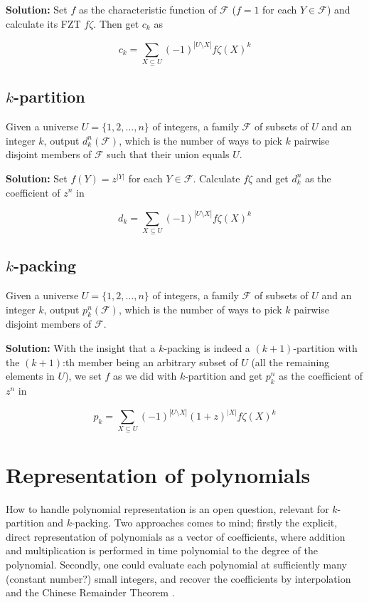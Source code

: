 \documentclass[a4paper, titlepage]{article}
\begin{document}
\textbf{Solution:} Set $f$ as the characteristic function of $\mathcal{F}$ ($f = 1$ for each $Y \in \mathcal{F}$) and calculate its FZT $f\zeta$. Then get $c_k$ as

$$
c_k = \sum_{X\subseteq U} (-1)^{|U \setminus X|}f\zeta(X)^k
$$

\subsection{$k$-partition}
Given a universe $U = \{1, 2, \ldots, n\}$ of integers, a family $\mathcal{F}$ of subsets of $U$ and an integer $k$, output $d_k^n(\mathcal{F})$, which is the number of ways to pick $k$ pairwise disjoint members of $\mathcal{F}$ such that their union equals $U$.

\textbf{Solution:} Set $f(Y) = z^{|Y|}$ for each $Y \in \mathcal{F}$. Calculate $f\zeta$ and get $d_k^n$ as the coefficient of $z^n$ in

$$
d_k = \sum_{X\subseteq U} (-1)^{|U \setminus X|}f\zeta(X)^k
$$

\subsection{$k$-packing}
Given a universe $U = \{1, 2, \ldots, n\}$ of integers, a family $\mathcal{F}$ of subsets of $U$ and an integer $k$, output $p_k^n(\mathcal{F})$, which is the number of ways to pick $k$ pairwise disjoint members of $\mathcal{F}$.

\textbf{Solution:} With the insight that a $k$-packing is indeed a $(k+1)$-partition with the $(k+1)$:th member being an arbitrary subset of $U$ (all the remaining elements in $U$), we set $f$ as we did with $k$-partition and get $p_k^n$ as the coefficient of $z^n$ in

$$
p_k = \sum_{X\subseteq U} (-1)^{|U \setminus X|} (1+z)^{|X|} f\zeta(X)^k
$$

\section{Representation of polynomials}
How to handle polynomial representation is an open question, relevant for $k$-partition and $k$-packing. Two approaches comes to mind; firstly the explicit, direct representation of polynomials as a vector of coefficients, where addition and multiplication is performed in time polynomial to the degree of the polynomial. Secondly, one could evaluate each polynomial at sufficiently many (constant number?) small integers, and recover the coefficients by interpolation and the Chinese Remainder Theorem \cite{CRT}.
\end{document}
